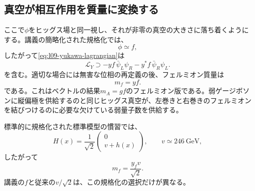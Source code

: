 \subsection{真空が相互作用を質量に変換する}

ここで\(\phi\)をヒッグス場と同一視し、それが非零の真空の大きさに落ち着くようにする。講義の簡略化された規格化では、
\begin{equation}
  \phi\simeq f,
\end{equation}
したがって\eqref{eq:l09-yukawa-lagrangian}は
\begin{equation}
  \mathcal L_Y
  \supset
  -yf\,\bar\psi_L\psi_R
  -y^*f\,\bar\psi_R\psi_L .
\end{equation}
を含む。適切な場合には無害な位相の再定義の後、フェルミオン質量は
\begin{equation}
  m_f=yf.
  \label{eq:l09-lecture-fermion-mass}
\end{equation}
である。これはベクトルの結果\(m_A=gf\)のフェルミオン版である。弱ゲージボソンに縦偏極を供給するのと同じヒッグス真空が、左巻きと右巻きのフェルミオンを結びつけるのに必要な欠けている弱量子数を供給する。

標準的に規格化された標準模型の慣習では、
\begin{equation}
  H(x)=\frac1{\sqrt2}
  \begin{pmatrix}
    0\\ v+h(x)
  \end{pmatrix},
  \qquad v\simeq246\ \mathrm{GeV},
  \label{eq:l09-sm-higgs-vacuum}
\end{equation}
したがって
\begin{equation}
  m_f=\frac{y_fv}{\sqrt2}.
  \label{eq:l09-sm-fermion-mass}
\end{equation}
講義の\(f\)と従来の\(v/\sqrt2\)は、この規格化の選択だけが異なる。

\begin{classroomqa}
\end{classroomqa}

\begin{classroomqa}
\end{classroomqa}

